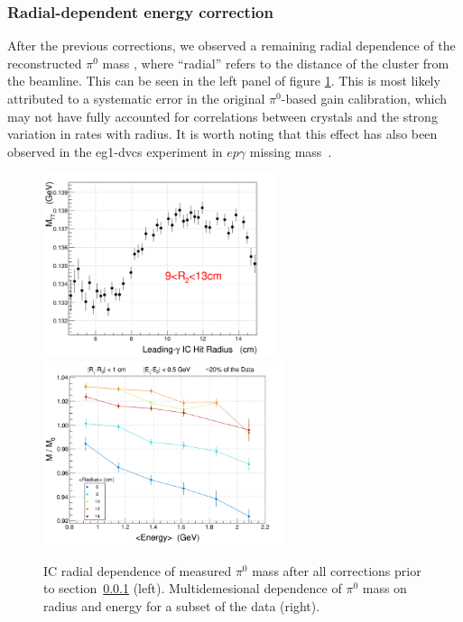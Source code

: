 \subsubsection{Radial-dependent energy correction}\label{sec:icraddepecorr}

After the previous corrections, we observed a remaining radial dependence of the reconstructed $\pi^{0}$ mass \cite{cristina}, where ``radial'' refers to the distance of the cluster from the beamline.  This can be seen in the left panel of figure \ref{fig:icRadiusEnergyData}.  
This is most likely attributed to a systematic error in the original $\pi^0$-based gain calibration, which may not have fully accounted for correlations between crystals and the strong variation in rates with radius.  It is worth noting that this effect has also been observed in the eg1-dvcs experiment in $ep\gamma$ missing mass~\cite{eg1dvcs_photonenergy}.

\begin{figure}[tp]\centering
    \includegraphics[height=5.4cm]{fig_simulation/Mgg_radius_2plateau.png}
    \includegraphics[height=5.4cm]{fig_simulation/m_m0_pi0_radius_nathan.png}
    \caption{IC radial dependence of measured $\pi^0$ mass after all corrections prior to section~\ref{sec:icraddepecorr} (left).  Multidemesional dependence of $\pi^0$ mass on radius and energy for a subset of the data (right).\label{fig:icRadiusEnergyData}}
\end{figure}

